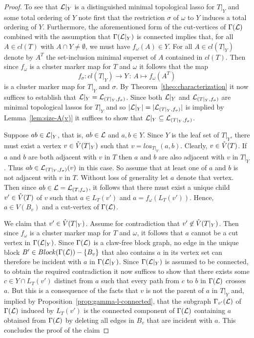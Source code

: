 \begin{proof}
  To see that ${\mathcal L}|_Y$ is a distinguished minimal topological lasso for $T|_Y$
  and some total ordering of $Y$ note first that the restriction $\sigma$ of
  $\omega$ to $Y$ induces a total ordering of $Y$.  Furthermore, the
  aforementioned form of the cut-vertices of $\Gamma({\mathcal L})$ combined with the
  assumption that $\Gamma({\mathcal L}|_Y)$ is connected implies that, for all $A\in
  cl(T)$ with $A\cap Y\not=\emptyset$, we must have $f_{\omega}(A)\in Y$. For
  all $A\in cl(T|_Y)$ denote by $A^T$ the set-inclusion minimal superset of
  $A$ contained in $cl(T)$.  Then since $f_{\omega}$ is a cluster marker map
  for $T$ and $\omega$ it follows that the map
  $$
  f_{\sigma}:cl(T|_Y)\to Y\,:\, A\mapsto f_{\omega}(A^T)
  $$
  is a cluster marker map for $T|_Y$ and $\sigma$.  By
  Theorem~\ref{theo:characterization} it now suffices to establish that
  ${\mathcal L}|_Y={\mathcal L}_{(T|_Y,f_{\sigma})}$. Since both ${\mathcal L}|_Y$ and
  ${\mathcal L}_{(T|_Y,f_{\sigma})}$ are minimal topological lassos for $T|_Y$ and so
  $|{\mathcal L}|_Y|=|{\mathcal L}_{(T|_Y,f_{\sigma})}|$ is implied by Lemma~\ref{lem:size-A(v)}
  it suffices to show that ${\mathcal L}|_Y\subseteq {\mathcal L}_{(T|_Y,f_{\sigma})}$.

  Suppose $ab\in {\mathcal L}|_Y$, that is, $ab\in{\mathcal L}$ and $a,b\in Y$. Since $Y$ is the
  leaf set of $T|_Y$, there must exist a vertex $v\in \mathring{V}(T|_Y)$ such that
  $v=lca_{T|_Y}(a,b)$. Clearly, $v\in \mathring{V}(T)$. If $a$ and $b$ are both
  adjacent with $v$ in $T$ then $a$ and $b$ are also adjacent with $v$ in
  $T|_Y$. Thus $ab\in{\mathcal L}_{(T|_Y,f_{\sigma})}(v)$ in this case.  So assume that
  at least one of $a$ and $b$ is not adjacent with $v$ in $T$.  Without loss
  of generality let $a$ denote that vertex.  Then since $ab\in {\mathcal L}=
  {\mathcal L}_{(T,f_{\omega})}$, it follows that there must exist a unique child
  $v'\in \mathring{V}(T)$ of $v$ such that $a\in L_T(v')$ and
  $a=f_{\omega}(L_T(v'))$. Hence, $a\in V(B_v)$ and a cut-vertex of
  $\Gamma({\mathcal L})$.

  We claim that $v'\in \mathring{V}(T|_Y)$. Assume for contradiction that $v'\not\in
  \mathring{V}(T|_Y)$. Then since $f_{\omega}$ is a cluster marker map for $T$ and
  $\omega$, it follows that $a$ cannot be a cut vertex in $\Gamma({\mathcal L}|_Y)$.
  Since $\Gamma({\mathcal L})$ is a claw-free block graph, no edge in the unique block
  $B'\in Block(\Gamma({\mathcal L}))-\{B_v\}$ that also contains $a$ in its vertex set
  can therefore be incident with $a$ in $\Gamma({\mathcal L}|_Y)$. Since
  $\Gamma({\mathcal L}|_Y)$ is assumed to be connected, to obtain the required
  contradiction it now suffices to show that there exists some $c\in Y\cap
  L_T(v')$ distinct from $a$ such that every path from $c$ to $b$ in
  $\Gamma({\mathcal L})$ crosses $a$.  But this is a consequence of the facts that $v$
  is not the parent of $a$ in $T|_Y$ and, implied by
  Proposition~\ref{prop:gamma-l-connected}, that the subgraph
  $\Gamma_{v'}({\mathcal L})$ of $\Gamma({\mathcal L})$ induced by $L_T(v')$ is the connected
  component of $\Gamma({\mathcal L})$ containing $a$ obtained from $\Gamma({\mathcal L})$ by
  deleting all edges in $B_v$ that are incident with $a$. This concludes the
  proof of the claim


\end{proof}
